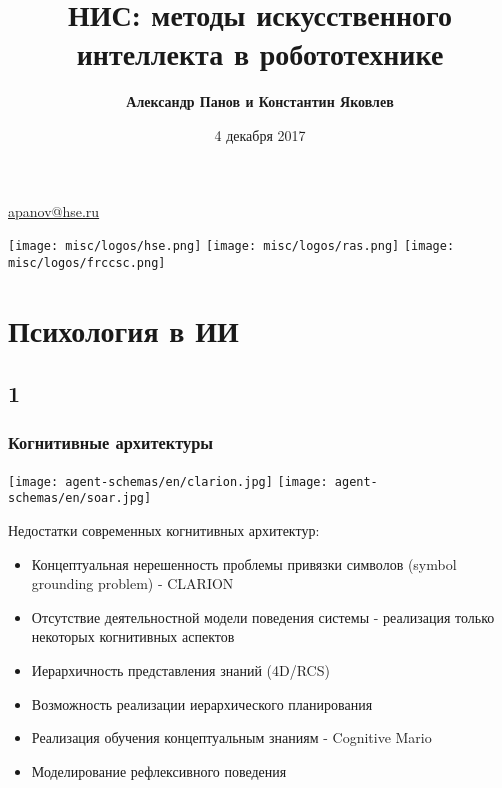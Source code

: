\documentclass[default]{beamer}
\begin{document}
	
	\title[РобоНИС]{НИС: методы искусственного интеллекта в робототехнике}
	\author[Панов, Яковлев]{\textbf{Александр Панов и Константин Яковлев}}
	\date{4 декабря 2017} 
	
	{
	\begin{frame}
		
		\titlepage
		\centering
		\href{mailto:apanov@hse.ru}{apanov@hse.ru}
		
		\texttt{[image: misc/logos/hse.png]} \hspace{10pt}
		\texttt{[image: misc/logos/ras.png]} \hspace{10pt}
		\texttt{[image: misc/logos/frccsc.png]}
		
	\end{frame}
	}	

	\section{Психология в ИИ}
	\subsection{1}

	\begin{frame}
		\frametitle{Когнитивные архитектуры}
		\begin{center}
			\texttt{[image: agent-schemas/en/clarion.jpg]}
			\texttt{[image: agent-schemas/en/soar.jpg]}
		\end{center}
		\scriptsize
		Недостатки современных когнитивных архитектур:
		\begin{itemize}
			\item Концептуальная нерешенность проблемы привязки символов (symbol grounding problem) - CLARION
			\item Отсутствие деятельностной модели поведения системы - реализация только некоторых когнитивных аспектов
			\item Иерархичность представления знаний (4D/RCS)
			\item Возможность реализации иерархического планирования
			\item Реализация обучения концептуальным знаниям - Cognitive Mario
			\item Моделирование рефлексивного поведения
		\end{itemize}

	\end{frame}
\end{document}
